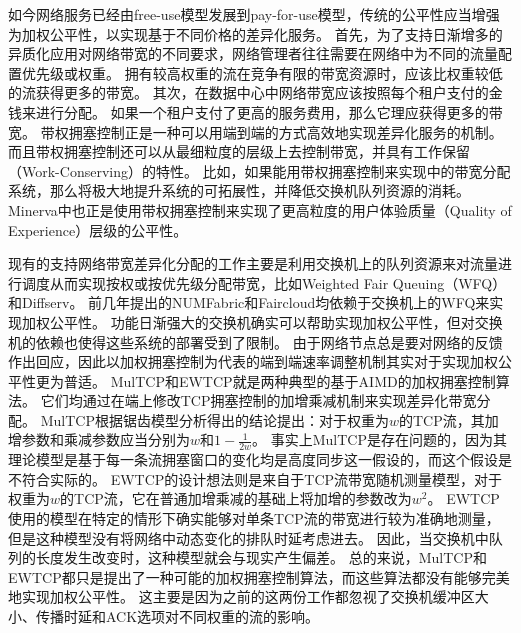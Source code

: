 \documentclass[winfonts]{njuthesis}
\begin{document}
如今网络服务已经由free-use模型发展到pay-for-use模型，传统的公平性应当增强为加权公平性，以实现基于不同价格的差异化服务。
首先，为了支持日渐增多的异质化应用对网络带宽的不同要求，网络管理者往往需要在网络中为不同的流量配置优先级或权重\cite{Hong2013SWAN}。
拥有较高权重的流在竞争有限的带宽资源时，应该比权重较低的流获得更多的带宽。
其次，在数据中心中网络带宽应该按照每个租户支付的金钱来进行分配\cite{popa2012faircloud}。
如果一个租户支付了更高的服务费用，那么它理应获得更多的带宽。
带权拥塞控制正是一种可以用端到端的方式高效地实现差异化服务的机制。
而且带权拥塞控制还可以从最细粒度的层级上去控制带宽，并具有工作保留（Work-Conserving）的特性。
比如，如果能用带权拥塞控制来实现\cite{popa2012faircloud}中的带宽分配系统，那么将极大地提升系统的可拓展性，并降低交换机队列资源的消耗。
Minerva\cite{Nathan2019wcubic}中也正是使用带权拥塞控制来实现了更高粒度的用户体验质量（Quality of Experience）层级的公平性。

现有的支持网络带宽差异化分配的工作主要是利用交换机上的队列资源来对流量进行调度从而实现按权或按优先级分配带宽，比如Weighted Fair Queuing（WFQ）\cite{demers1989analysis}\cite{Abhay1993WFQ}和Diffserv\cite{Kathleen1998Diffserv}。
前几年提出的NUMFabric\cite{nagaraj2016numfabric}和Faircloud\cite{popa2012faircloud}均依赖于交换机上的WFQ来实现加权公平性。
功能日渐强大的交换机确实可以帮助实现加权公平性，但对交换机的依赖也使得这些系统的部署受到了限制。
由于网络节点总是要对网络的反馈作出回应，因此以加权拥塞控制为代表的端到端速率调整机制其实对于实现加权公平性更为普适。
MulTCP\cite{crowcroft1998differentiated}和EWTCP\cite{wischik2011design}就是两种典型的基于AIMD的加权拥塞控制算法。
它们均通过在端上修改TCP拥塞控制的加增乘减机制来实现差异化带宽分配。
MulTCP根据锯齿模型分析得出的结论\cite{Floyd1997Sawtooth}提出：对于权重为$w$的TCP流，其加增参数和乘减参数应当分别为$w$和$1-\frac{1}{2w}$。
事实上MulTCP是存在问题的，因为其理论模型是基于每一条流拥塞窗口的变化均是高度同步这一假设的，而这个假设是不符合实际的。
EWTCP的设计想法则是来自于TCP流带宽随机测量模型\cite{padhye1998modeling}，对于权重为$w$的TCP流，它在普通加增乘减的基础上将加增的参数改为$w^2$。
EWTCP使用的模型在特定的情形下确实能够对单条TCP流的带宽进行较为准确地测量，但是这种模型没有将网络中动态变化的排队时延考虑进去。
因此，当交换机中队列的长度发生改变时，这种模型就会与现实产生偏差。
总的来说，MulTCP和EWTCP都只是提出了一种可能的加权拥塞控制算法，而这些算法都没有能够完美地实现加权公平性。
这主要是因为之前的这两份工作\cite{crowcroft1998differentiated}\cite{wischik2011design}都忽视了交换机缓冲区大小、传播时延和ACK选项对不同权重的流的影响。
\end{document}

